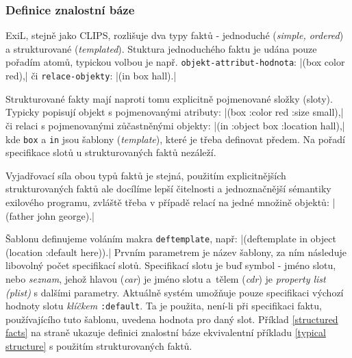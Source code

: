 \subsubsection{Definice znalostní báze}
\label{knowledge base definition}

ExiL, stejně jako CLIPS, rozlišuje dva typy faktů - jednoduché (\emph{simple,
ordered}) a strukturované (\emph{templated}). Stuktura jednoduchého faktu je udána
pouze pořadím atomů, typickou volbou je např. \verb|objekt-attribut-hodnota|:
\cl|(box color red),| či \verb|relace-objekty|: \cl|(in box hall).|

Strukturované fakty mají naproti tomu explicitně pojmenované složky (sloty).
Typicky popisují objekt s pojmenovanými atributy:
\cl|(box :color red :size small),| či relaci s pojmenovanými zůčastněnými
objekty: \cl|(in :object box :location hall),| kde \verb|box| a \verb|in| jsou
šablony (\emph{template}), které je třeba definovat předem. Na pořadí
specifikace slotů u strukturovaných faktů nezáleží.

Vyjadřovací síla obou typů faktů je stejná, použitím explicitnějších
strukturovaných faktů ale docílíme lepší čitelnosti a jednoznačnější sémantiky
exilového programu, zvláště třeba v případě relací na jedné množině objektů:
\cl|(father john george).|

Šablonu definujeme voláním makra \verb|deftemplate|, např:
\cl|(deftemplate in object (location :default here)).| Prvním parametrem je
název šablony, za ním následuje libovolný počet specifikací slotů. Specifikací
slotu je buď symbol - jméno slotu, nebo \emph{seznam}, jehož hlavou
(\emph{car}) je jméno slotu a~tělem (\emph{cdr}) je \emph{property list (plist)}
s dalšími parametry. Aktuálně systém umožňuje pouze specifikaci výchozí hodnoty
slotu \emph{klíčkem} \verb|:default|. Ta je použita, není-li při specifikaci
faktu, používajícího tuto šablonu, uvedena hodnota pro daný slot. Příklad
\ref{structured facts} na straně \pageref{structured facts} ukazuje definici
znalostní báze ekvivalentní příkladu \ref{typical structure} s použitím
strukturovaných faktů.

